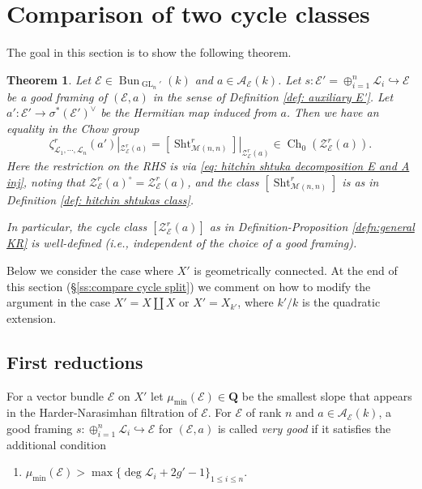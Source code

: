 \documentclass[reqno]{amsart}
\numberwithin{equation}{section}
\newcommand\mnote[1]{\marginpar{\tiny #1}}
\newcommand{\Q}{\mathbf{Q}}
\newcommand{\inj}{\hookrightarrow}
\DeclareMathOperator{\GL}{GL}
\DeclareMathOperator{\Bun}{Bun}
\DeclareMathOperator{\Sht}{Sht}
\DeclareMathOperator{\Ch}{Ch}
\newcommand\op{\oplus}
\newcommand{\s}{\sigma}
\newcommand{\z}{\zeta}
\newcommand\cA{\mathcal{A}}
\newcommand\cE{\mathcal{E}}
\newcommand\cL{\mathcal{L}}
\newcommand\cM{\mathcal{M}}
\newcommand\cZ{\mathcal{Z}}
\newtheorem{thm}{Theorem}[section]
\theoremstyle{remark}
\numberwithin{equation}{section}
\begin{document}





\section{Comparison of two cycle classes}\label{s:compare cycles}
The goal in this section is to show the following theorem.

\begin{thm}\label{th:compare KR} Let $\cE\in \Bun_{\GL_{n}'}(k)$ and $a\in \cA_{\cE}(k)$. Let $s:\cE'=\op_{i=1}^{n}\cL_{i}\inj \cE$ be a good framing of $(\cE,a)$ in the sense of Definition \ref{def: auxiliary E'}. Let $a':\cE'\to\s^{*}(\cE')^{\vee}$ be the Hermitian map induced from $a$. Then we have an equality in the Chow group
\begin{equation}\label{KR vs ShtM} 
\z^{r}_{\cL_{1},\cdots, \cL_{n}}(a')|_{\cZ^{r}_{\cE}(a)}=[\Sht^{r}_{\cM(n,n)}]|_{\cZ^{r}_{\cE}(a)}\in \Ch_{0}(\cZ^{r}_{\cE}(a)).
\end{equation}
Here the restriction on the RHS is via \eqref{eq: hitchin shtuka decomposition E and A inj}, noting that $\cZ_{\cE}^r(a)^{\circ}=\cZ_{\cE}^r(a)$, and the class $[\Sht^{r}_{\cM(n,n)}]$ is as in Definition \ref{def: hitchin shtukas class}.%

In particular, the cycle class $[\cZ^{r}_{\cE}(a)]$ as in Definition-Proposition \ref{defn:general KR} is well-defined (i.e., independent of the choice of a good framing). 
\end{thm}

Below we consider the case where $X'$ is geometrically connected. At the end of this section (\S\ref{ss:compare cycle split}) we comment on how to modify the argument in the case $X'=X\coprod X$ or $X'=X_{k'}$, where $k'/k$ is the quadratic extension.

\subsection{First reductions}
For a vector bundle $\cE$ on $X'$ let $\mu_{\min}(\cE)\in \Q$ be the smallest slope that appears in the Harder-Narasimhan filtration of $\cE$.  For $\cE$ of rank $n$ and $a\in \cA_{\cE}(k)$, a good framing $s:\op_{i=1}^{n}\cL_{i}\inj \cE$ for $(\cE,a)$ is called {\em very good} if it satisfies the additional condition
\begin{enumerate}
\item[(3)] $\mu_{\min}(\cE)>\max\{\deg\cL_{i}+2g'-1\}_{1\le i\le n}$.
\end{enumerate}
\end{document}
